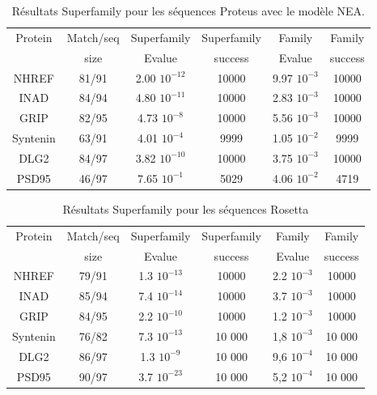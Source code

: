 \begin{table}[h]
  
  \begin{tabular}{cccccc}
    
    \toprule
    Protein & Match/seq & Superfamily & Superfamily & Family & Family \\
            & size      & Evalue      & success     & Evalue & success\\
    \cmidrule{1-6}
    NHREF  & 81/91 &     2.00 $10^{-12}$ & 10000  & 9.97 $10^{-3}$ & 10000  \\
    INAD  & 84/94 &      4.80 $10^{-11}$ & 10000  & 2.83 $10^{-3}$ & 10000  \\
    GRIP  & 82/95 &      4.73 $10^{-8}$  & 10000  & 5.56 $10^{-3}$ & 10000  \\
    Syntenin  & 63/91 &  4.01 $10^{-4}$  &  9999  & 1.05 $10^{-2}$ &  9999  \\
    DLG2  & 84/97 &      3.82 $10^{-10}$ & 10000  & 3.75 $10^{-3}$ & 10000  \\
    PSD95  & 46/97 &     7.65 $10^{-1}$  &  5029  & 4.06 $10^{-2}$ &  4719  \\

    \bottomrule        
  \end{tabular}   
  \caption{Résultats Superfamily pour les séquences Proteus avec le modèle NEA.}   
  \label{tab:superfamily_model_B6}       
\end{table}

\begin{table}[h]

  \begin{tabular}{cccccc}
    
    \toprule
    Protein & Match/seq & Superfamily & Superfamily & Family & Family \\
            & size      & Evalue      & success     & Evalue & success\\
    \cmidrule{1-6}
    NHREF    & 79/91   &    1.3 $10^{-13}$ & 10000 & 2.2 $10^{-3}$ & 10000 \\
    INAD     & 85/94   &    7.4 $10^{-14}$ & 10000 & 3.7 $10^{-3}$ & 10000 \\
    GRIP     & 84/95   &    2.2 $10^{-10}$ & 10000 & 1.2 $10^{-3}$ & 10000 \\
    Syntenin & 76/82   &    7.3 $10^{-13}$ & 10 000 & 1,8 $10^{-3}$ & 10 000 \\
    DLG2     & 86/97   &    1.3 $10^{-9}$  & 10 000 & 9,6 $10^{-4}$ & 10 000 \\
    PSD95    & 90/97   &    3.7 $10^{-23}$ & 10 000 & 5,2 $10^{-4}$ & 10 000 \\
    \bottomrule        
  \end{tabular}   
  \caption{Résultats Superfamily pour les séquences Rosetta}   
  \label{tab:superfamily_bestRE}       
\end{table}


